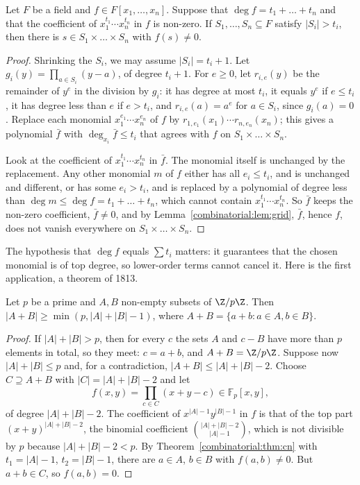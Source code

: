 \begin{theorem}\label{combinatorial:thm:cn}
Let $F$ be a field and $f\in F[x_1,\dots,x_n]$. Suppose that $\deg f=t_1+\dots+t_n$ and that the coefficient of $x_1^{t_1}\cdots x_n^{t_n}$ in $f$ is non-zero. If $S_1,\dots,S_n\subseteq F$ satisfy $|S_i|>t_i$, then
there is $s\in S_1\times\dots\times S_n$ with $f(s)\ne0$.
\end{theorem}
\begin{proof}
Shrinking the $S_i$, we may assume $|S_i|=t_i+1$. Let $g_i(y)=\prod_{a\in S_i}(y-a)$, of degree $t_i+1$. For $e\ge0$, let $r_{i,e}(y)$ be the remainder of $y^e$ in the division by $g_i$: it has degree at most $t_i$, it
equals $y^e$ if $e\le t_i$, it has degree less than $e$ if $e>t_i$, and $r_{i,e}(a)=a^e$ for $a\in S_i$, since $g_i(a)=0$. Replace each monomial $x_1^{e_1}\cdots x_n^{e_n}$ of $f$ by $r_{1,e_1}(x_1)\cdots r_{n,e_n}(x_n)$; this gives
a polynomial $\bar f$ with $\deg_{x_i}\bar f\le t_i$ that agrees with $f$ on $S_1\times\dots\times S_n$.

Look at the coefficient of $x_1^{t_1}\cdots x_n^{t_n}$ in $\bar f$. The monomial itself is unchanged by the replacement. Any other monomial $m$ of $f$ either has all $e_i\le t_i$, and is unchanged and different, or has
some $e_i>t_i$, and is replaced by a polynomial of degree less than $\deg m\le\deg f=t_1+\dots+t_n$, which cannot contain $x_1^{t_1}\cdots x_n^{t_n}$. So $\bar f$ keeps the non-zero coefficient, $\bar f\ne0$, and by
Lemma~\ref{combinatorial:lem:grid}, $\bar f$, hence $f$, does not vanish everywhere on $S_1\times\dots\times S_n$.
\end{proof}

The hypothesis that $\deg f$ equals $\sum t_i$ matters: it guarantees that the chosen monomial is of top degree, so lower-order terms cannot cancel it. Here is the first application, a theorem of 1813.

\begin{theorem}\label{combinatorial:thm:cd}
Let $p$ be a prime and $A,B$ non-empty subsets of $\Z/p\Z$. Then $|A+B|\ge\min(p,|A|+|B|-1)$, where $A+B=\{a+b:a\in A,b\in B\}$.
\end{theorem}
\begin{proof}
If $|A|+|B|>p$, then for every $c$ the sets $A$ and $c-B$ have more than $p$ elements in total, so they meet: $c=a+b$, and $A+B=\Z/p\Z$. Suppose now $|A|+|B|\le p$ and, for a contradiction,
$|A+B|\le|A|+|B|-2$. Choose $C\supseteq A+B$ with $|C|=|A|+|B|-2$ and let
\[
f(x,y)=\prod_{c\in C}(x+y-c)\in\mathbb F_p[x,y],
\]
of degree $|A|+|B|-2$. The coefficient of $x^{|A|-1}y^{|B|-1}$ in $f$ is that of the top part $(x+y)^{|A|+|B|-2}$, the binomial coefficient $\binom{|A|+|B|-2}{|A|-1}$, which is not divisible by $p$ because
$|A|+|B|-2<p$. By Theorem~\ref{combinatorial:thm:cn} with $t_1=|A|-1$, $t_2=|B|-1$, there are $a\in A$, $b\in B$ with $f(a,b)\ne0$. But $a+b\in C$, so $f(a,b)=0$.
\end{proof}

